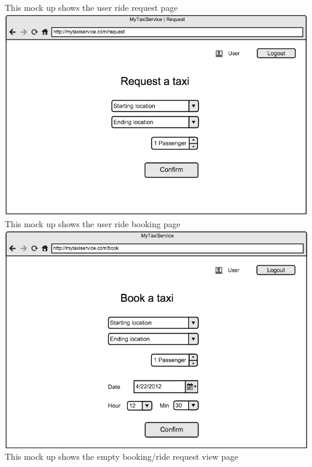 \documentclass[11pt,titlepage]{article} %
\begin{document}
        \newpage
        \noindent
        This mock up shows the user ride request page\newline
        \newline
        \includegraphics[scale=0.52]{taxiReqInt.png}\newline
        \newpage
        \noindent
        This mock up shows the user ride booking page\newline
       \newline
        \includegraphics[scale=0.52]{taxiBookInt.png}\newline
        \newpage
        \noindent
        This mock up shows the empty booking/ride request view page\newline
        \newline
\end{document}
